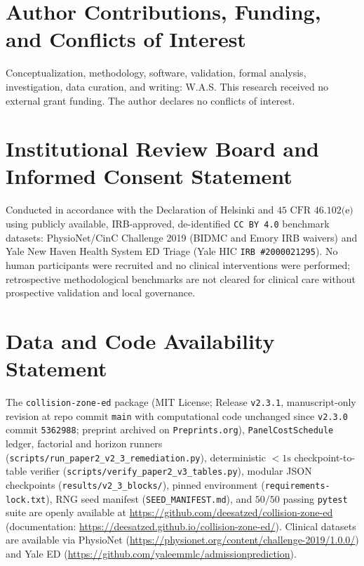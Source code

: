 \documentclass[11pt]{article}
\begin{document}
\section*{Author Contributions, Funding, and Conflicts of Interest}

Conceptualization, methodology, software, validation, formal analysis, investigation, data curation, and writing: W.A.S. This research received no external grant funding. The author declares no conflicts of interest.

\section*{Institutional Review Board and Informed Consent Statement}

Conducted in accordance with the Declaration of Helsinki and $45\text{ CFR }46.102\text{(e)}$ using publicly available, IRB-approved, de-identified \texttt{CC BY 4.0} benchmark datasets: PhysioNet/CinC Challenge 2019 \citep{goldberger2000physionet,reyna2020early} (BIDMC and Emory IRB waivers) and Yale New Haven Health System ED Triage \citep{hong2018predicting} (Yale HIC \texttt{IRB \#2000021295}). No human participants were recruited and no clinical interventions were performed; retrospective methodological benchmarks are not cleared for clinical care without prospective validation and local governance.

\section*{Data and Code Availability Statement}

{\raggedright The \texttt{collision-zone-ed} package (MIT License; Release \texttt{v2.3.1}, manuscript-only revision at repo commit \texttt{main} with computational code unchanged since \texttt{v2.3.0} commit \texttt{5362988}; preprint archived on \texttt{Preprints.org}), \texttt{PanelCostSchedule} ledger, factorial and horizon runners (\texttt{scripts/run\_paper2\_v2\_3\_remediation.py}), deterministic $<1\text{s}$ checkpoint-to-table verifier (\texttt{scripts/verify\_paper2\_v3\_tables.py}), modular JSON checkpoints (\texttt{results/v2\_3\_blocks/}), pinned environment (\texttt{requirements-lock.txt}), RNG seed manifest (\texttt{SEED\_MANIFEST.md}), and $50/50$ passing \texttt{pytest} suite are openly available at \url{https://github.com/deesatzed/collision-zone-ed} (documentation: \url{https://deesatzed.github.io/collision-zone-ed/}). Clinical datasets are available via PhysioNet (\url{https://physionet.org/content/challenge-2019/1.0.0/}) and Yale ED (\url{https://github.com/yaleemmlc/admissionprediction}).\par}
\end{document}
